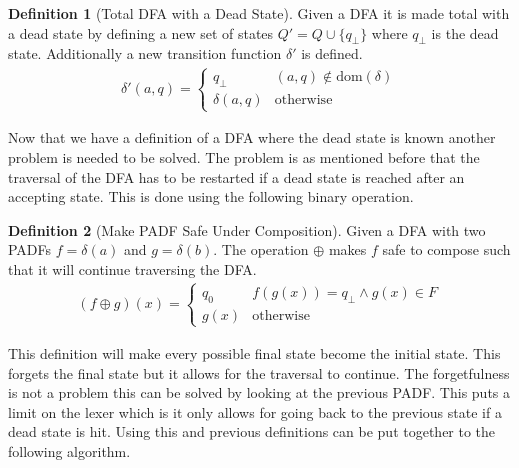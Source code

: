 \documentclass[a4paper,12pt]{article}
\theoremstyle{definition}
\newtheorem{definition}{Definition}[section]
\begin{document}
\begin{definition}[Total DFA with a Dead State]
  Given a DFA it is made total with a dead state by defining a new set of states $Q' = Q \cup \{q_{\bot}\}$ where $q_{\bot}$ is the dead state. Additionally a new transition function $\delta'$ is defined.
  \begin{align*}
    \delta'(a, q) = \begin{cases}
      q_{\bot} &  (a, q) \notin \text{dom}(\delta) \\
      \delta(a, q) & \text{otherwise}
    \end{cases}
  \end{align*}
\end{definition}
\noindent Now that we have a definition of a DFA where the dead state is known another problem is needed to be solved. The problem is as mentioned before that the traversal of the DFA has to be restarted if a dead state is reached after an accepting state. This is done using the following binary operation.

\begin{definition}[Make PADF Safe Under Composition]
  Given a DFA with two PADFs $f = \delta(a)$ and $g = \delta(b)$. The operation $\oplus$ makes $f$ safe to compose such that it will continue traversing the DFA.
  \begin{align*}
    (f \oplus g)(x) =
    \begin{cases}
      q_0 & f(g(x)) = q_{\bot} \land g(x) \in F \\
      g(x) & \text{otherwise} 
    \end{cases}
  \end{align*}
\end{definition}
\noindent This definition will make every possible final state become the initial state. This forgets the final state but it allows for the traversal to continue. The forgetfulness is not a problem this can be solved by looking at the previous PADF. This puts a limit on the lexer which is it only allows for going back to the previous state if a dead state is hit.
Using this and previous definitions can be put together to the following algorithm.
\end{document}
